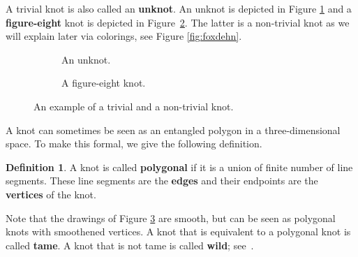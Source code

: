 \documentclass[11pt,a4paper]{article}
\theoremstyle{definition}
\newtheorem{definition}[theorem]{Definition}
\begin{document}
A trivial knot is also called an \textbf{unknot}. An unknot is depicted in Figure \ref{fig:unknot} and a \textbf{figure-eight} knot
is depicted in Figure~\ref{fig:fig8}. The latter is a non-trivial knot as we will explain later via colorings, see Figure \ref{fig:foxdehn}.


\begin{figure}[h!]
    \centering
\begin{subfigure}{.4\textwidth}
\centering
{} 
    \caption{An unknot.}
    \label{fig:unknot}
\end{subfigure}
\hspace{0.1\textwidth}
\begin{subfigure}{.4\textwidth}
\centering
    \caption{A figure-eight knot.}
    \label{fig:fig8}

\end{subfigure}

\caption{An example of a trivial and a non-trivial knot.}
\label{fig:exampleknots}

\end{figure}

A knot can sometimes be seen as an entangled polygon in a three-dimensional space. To make this formal, we give the following definition.

\begin{definition}
\label{def:polygonal}
A knot is called \textbf{polygonal} if it is a union of finite number of line segments. These line segments are the \textbf{edges} and their endpoints are the \textbf{vertices} of the knot.
\end{definition}

Note that the drawings of Figure \ref{fig:exampleknots} are smooth, but can be seen as polygonal knots with smoothened vertices. 
A knot that is equivalent to a polygonal knot is called \textbf{tame}. A knot that is not tame is called \textbf{wild}; see~\cite[Chapter~I]{crowell2012introduction}.
\end{document}
